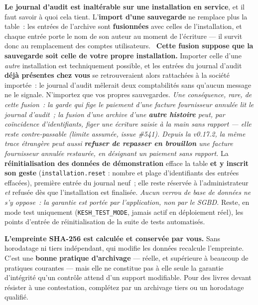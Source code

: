 \documentclass[a4paper,11pt,oneside]{article}
\begin{document}
\begin{keshwarning}[title=\faExclamationTriangle\ Deux réserves à connaître avant d'invoquer cette conformité]
\textbf{Le journal d'audit est inaltérable sur une installation en service}, et il faut
savoir à quoi cela tient. L'\textbf{import d'une sauvegarde} ne remplace plus la table~: les
entrées de l'archive sont \textbf{fusionnées} avec celles de l'installation, et chaque entrée
porte le nom de son auteur au moment de l'écriture --- il survit donc au remplacement des
comptes utilisateurs. \faExclamationTriangle\ \textbf{Cette fusion suppose que la sauvegarde
soit celle de votre propre installation.} Importer celle d'une \emph{autre} installation est techniquement
possible, et les entrées du journal d'audit \textbf{déjà présentes chez vous} se retrouveraient alors
rattachées à la société importée~: le journal d'audit mêlerait deux comptabilités sans
qu'aucun message ne le signale. N'importez que vos propres sauvegardes. \emph{Une conséquence, rare, de cette fusion~: la garde qui fige le paiement d'une facture fournisseur annulée lit le journal d'audit~; la fusion d'une archive d'une \textbf{autre histoire} peut, par coïncidence d'identifiants, figer une écriture saisie à la main sans rapport --- elle reste contre-passable (limite assumée, issue \#541). Depuis la v0.17.2, la même trace étrangère peut aussi \textbf{refuser de repasser en brouillon} une facture fournisseur annulée restaurée, en désignant un paiement sans rapport.} La
\textbf{réinitialisation des données de démonstration} efface la table \textbf{et y
inscrit son geste} (\texttt{installation.reset} : nombre et plage d'identifiants des
entrées effacées), première entrée du journal neuf~; elle reste réservée à
l'administrateur \emph{et} refusée dès que l'installation est finalisée. \emph{Aucun verrou de base de données ne s'y oppose~: la
garantie est portée par l'application, non par le SGBD.} Reste, en mode test uniquement
(\texttt{KESH\_TEST\_MODE}, jamais actif en déploiement réel), les points d'entrée de
réinitialisation de la suite de tests automatisés.

\medskip
\noindent \textbf{L'empreinte SHA-256 est calculée et conservée par vous.} Sans horodatage ni
tiers indépendant, qui modifie les données recalcule l'empreinte. C'est une \textbf{bonne
pratique d'archivage} --- réelle, et supérieure à beaucoup de pratiques courantes --- mais
elle ne constitue pas à elle seule la garantie d'intégrité qu'un contrôle attend d'un support
modifiable. Pour des livres devant résister à une contestation, complétez par un archivage
tiers ou un horodatage qualifié.
\end{keshwarning}
\end{document}
